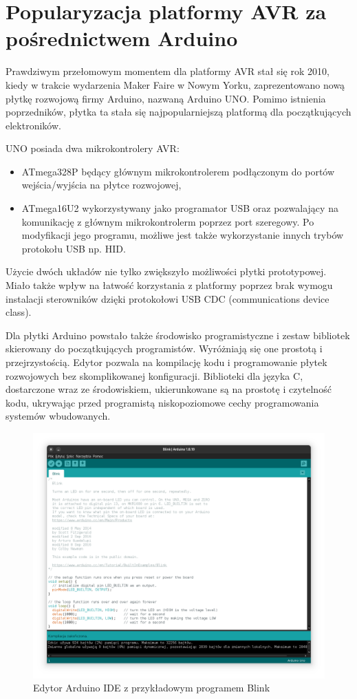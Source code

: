 \section{Popularyzacja platformy AVR za pośrednictwem Arduino}

Prawdziwym przełomowym momentem dla platformy AVR stał się rok 2010, kiedy w trakcie wydarzenia Maker Faire w Nowym Yorku, zaprezentowano nową płytkę rozwojową firmy Arduino, nazwaną Arduino UNO. Pomimo istnienia poprzedników, płytka ta stała się najpopularniejszą platformą dla początkujących elektroników.

UNO posiada dwa mikrokontrolery AVR:
\begin{itemize}
\item ATmega328P będący głównym mikrokontrolerem podłączonym do portów wejścia/wyjścia na płytce rozwojowej,
\item ATmega16U2 wykorzystywany jako programator USB oraz pozwalający na komunikację z głównym mikrokontrolerm poprzez port szeregowy. Po modyfikacji jego programu, możliwe jest także wykorzystanie innych trybów protokołu USB np. HID.
\end{itemize}
Użycie dwóch układów nie tylko zwiększyło możliwości płytki prototypowej. Miało także wpływ na łatwość korzystania z platformy poprzez brak wymogu instalacji sterowników dzięki protokołowi USB CDC (communications device class).

Dla płytki Arduino powstało także środowisko programistyczne i zestaw bibliotek skierowany do początkujących programistów. Wyróżniają się one prostotą i przejrzystością. Edytor pozwala na kompilację kodu i programowanie płytek rozwojowych bez skomplikowanej konfiguracji. Biblioteki dla języka C, dostarczone wraz ze środowiskiem, ukierunkowane są na prostotę i czytelność kodu, ukrywając przed programistą niskopoziomowe cechy programowania systemów wbudowanych.
\begin{figure}[H]
\centering
	\includegraphics[width=1\textwidth]{graf/arduino-ide-blink.png}
		\caption{Edytor Arduino IDE z przykładowym programem Blink}
\end{figure}

